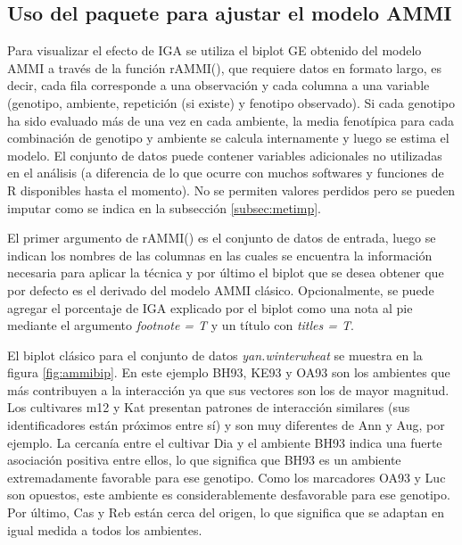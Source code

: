   
\subsection{Uso del paquete para ajustar el modelo AMMI}

Para visualizar el efecto de IGA se utiliza el biplot GE obtenido del modelo AMMI a través de la función \textcolor{fandango}{rAMMI()}, que requiere datos en formato largo, es decir, cada fila corresponde a una observación y cada columna a una variable (genotipo, ambiente, repetición (si existe) y fenotipo observado). Si cada genotipo ha sido evaluado más de una vez en cada ambiente, la media fenotípica para cada combinación de genotipo y ambiente se calcula internamente y luego se estima el modelo. El conjunto de datos puede contener variables adicionales no utilizadas en el análisis (a diferencia de lo que ocurre con muchos softwares y funciones de R disponibles hasta el momento). No se permiten valores perdidos pero se pueden imputar como se indica en la subsección \ref{subsec:metimp}. 

El primer argumento de \textcolor{fandango}{rAMMI()} es el conjunto de datos de entrada, luego se indican los nombres de las columnas en las cuales se encuentra la información necesaria para aplicar la técnica y por último el biplot que se desea obtener que por defecto es el derivado del modelo AMMI clásico. Opcionalmente, se puede agregar el porcentaje de IGA explicado por el biplot como una nota al pie mediante el argumento \emph{footnote = T} y un título con \emph{titles = T}. 

El biplot clásico para el conjunto de datos \emph{yan.winterwheat} se muestra en la figura
\ref{fig:ammibip}. En este ejemplo BH93, KE93 y OA93 son los ambientes que más contribuyen a la interacción ya que sus vectores son los de mayor magnitud. Los cultivares m12 y Kat presentan patrones de interacción similares (sus identificadores están próximos entre sí) y son muy diferentes de Ann y Aug, por ejemplo. La cercanía entre el cultivar Dia y el ambiente BH93 indica una fuerte asociación positiva entre ellos, lo que significa que BH93 es un ambiente extremadamente favorable para ese genotipo. Como los marcadores OA93 y Luc son opuestos, este ambiente es considerablemente desfavorable para ese genotipo. Por último, Cas y Reb están cerca del origen, lo que significa que se adaptan en igual medida a todos los ambientes.

